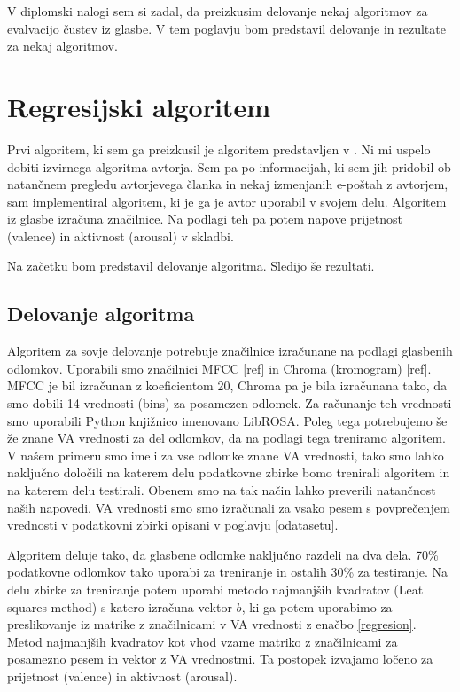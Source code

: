 \documentclass[a4paper, 12pt]{book}
\begin{document}
{V diplomski nalogi sem si zadal, da preizkusim delovanje nekaj algoritmov za evalvacijo čustev iz glasbe. V tem poglavju bom predstavil delovanje in rezultate za nekaj algoritmov. 

\section{Regresijski algoritem}

Prvi algoritem, ki sem ga preizkusil je algoritem predstavljen v \cite{schmidt2009projection}. Ni mi uspelo dobiti izvirnega algoritma avtorja. Sem pa po informacijah, ki sem jih pridobil ob natančnem pregledu avtorjevega članka in nekaj izmenjanih e-poštah z avtorjem, sam implementiral algoritem, ki je ga je avtor uporabil v svojem delu. Algoritem iz glasbe izračuna značilnice. Na podlagi teh pa potem napove prijetnost (valence) in aktivnost (arousal) v skladbi. 

Na začetku bom predstavil delovanje algoritma. Sledijo še rezultati.

\subsection{Delovanje algoritma} 

Algoritem za sovje delovanje potrebuje značilnice izračunane na podlagi glasbenih odlomkov. Uporabili smo značilnici MFCC [ref] in Chroma (kromogram) [ref]. MFCC je bil izračunan z koeficientom 20, Chroma pa je bila izračunana tako, da smo dobili 14 vrednosti (bins) za posamezen odlomek. Za računanje teh vrednosti smo uporabili Python knjižnico imenovano LibROSA. Poleg tega potrebujemo še že znane VA vrednosti za del odlomkov, da na podlagi tega treniramo algoritem. V našem primeru smo imeli za vse odlomke znane VA vrednosti, tako smo lahko naključno določili na katerem delu podatkovne zbirke bomo trenirali algoritem in na katerem delu testirali. Obenem smo na tak način lahko preverili natančnost naših napovedi. VA vrednosti smo smo izračunali za vsako pesem s povprečenjem vrednosti v podatkovni zbirki opisani v poglavju \ref{odatasetu}.

Algoritem deluje tako, da glasbene odlomke naključno razdeli na dva dela. 70\% podatkovne odlomkov tako uporabi za treniranje in ostalih 30\% za testiranje. Na delu zbirke za treniranje potem uporabi metodo najmanjših kvadratov (Leat squares method) \cite{abdi2007method} s katero izračuna vektor $b$, ki ga potem uporabimo za preslikovanje iz matrike z značilnicami v VA vrednosti z enačbo \ref{regresion}. Metod najmanjših kvadratov kot vhod vzame matriko z značilnicami za posamezno pesem in vektor z VA vrednostmi. Ta postopek izvajamo ločeno za prijetnost (valence) in aktivnost (arousal).  

}
\end{document}
